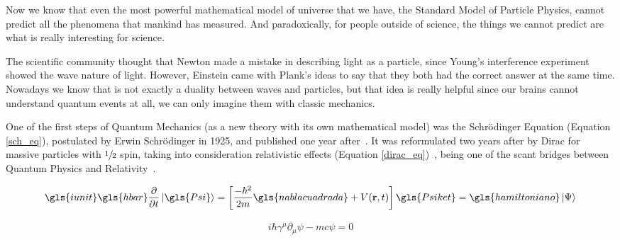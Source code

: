 Now we know that even the most powerful mathematical model of universe that we
have, the Standard Model of Particle Physics, cannot predict all the phenomena
that mankind has measured.  And paradoxically, for people outside of science,
the things we cannot predict are what is really interesting for science.

The scientific community thought that Newton made a mistake in describing light
as a particle, since Young's interference experiment showed the wave nature of
light. However, Einstein came with Plank's ideas \cite{Einstein1905} to say
that they both had the correct answer at the same time. Nowadays we know that
is not exactly a duality between waves and particles, but that idea is really
helpful since our brains cannot understand quantum events at all, we can only
imagine them with classic mechanics.

One of the first steps of Quantum Mechanics (as a new theory with its own
mathematical model) was the Schrödinger Equation (Equation \ref{sch_eq}),
postulated by Erwin Schrödinger in 1925, and published one year
after~\citet{Schrdinger1926}. It was reformulated two years after by Dirac for
massive particles with $\sfrac{1}{2}$ spin, taking into consideration
relativistic effects (Equation \ref{dirac_eq})~\citep{Dirac1928}, being one of
the scant bridges between Quantum Physics and Relativity~\cite{Halzen1984}.

\begin{equation}
\gls{iunit}\gls{hbar}\frac{\partial}{\partial t}\ket{\gls{Psi}} = \left [ \frac{-\hbar^2}{2m}\gls{nablacuadrada}
+ V(\mathbf{r},t) \right ] \gls{Psiket} = \gls{hamiltoniano}\ket{\Psi}
\label{sch_eq}
\end{equation}

\begin{align}
i\hbar\gamma^{\mu}\partial_{\mu}\psi - mc\psi = 0
\label{dirac_eq}
\end{align}



